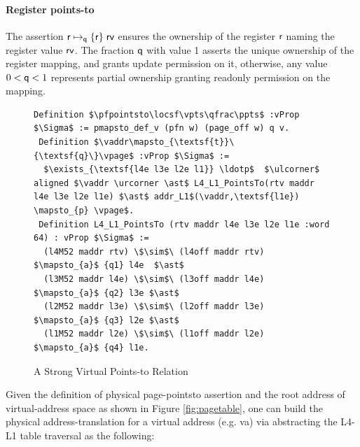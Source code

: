 \paragraph{Register points-to} The assertion $\mathsf{r}\mapsto_{\mathsf{q}}\{\mathsf{r}\}\;\mathsf{rv}$ ensures the ownership of the register $\mathsf{r}$ naming the register value $\mathsf{rv}$. The fraction $\mathsf{q}$ with value 1 asserts the unique ownership of the register mapping, and grants update permission on it, otherwise, any value $0 < \mathsf{q} <1$ represents partial ownership granting readonly permission on the mapping.
\begin{figure}
  \begin{lstlisting}[language=Coq]
 Definition $\pfpointsto\locsf\vpts\qfrac\ppts$ :vProp $\Sigma$ := pmapsto_def_v (pfn w) (page_off w) q v.
 Definition $\vaddr\mapsto_{\textsf{t}}\{\textsf{q}\}\vpage$ :vProp $\Sigma$ := 
  $\exists_{\textsf{l4e l3e l2e l1}} \ldotp$  $\ulcorner$ aligned $\vaddr \urcorner \ast$ L4_L1_PointsTo(rtv maddr l4e l3e l2e l1e) $\ast$ addr_L1$(\vaddr,\textsf{l1e}) \mapsto_{p} \vpage$.
 Definition L4_L1_PointsTo (rtv maddr l4e l3e l2e l1e :word 64) : vProp $\Sigma$ :=
  (l4M52 maddr rtv) \$\sim$\ (l4off maddr rtv) $\mapsto_{a}$ {q1} l4e  $\ast$
  (l3M52 maddr l4e) \$\sim$\ (l3off maddr l4e)  $\mapsto_{a}$ {q2} l3e $\ast$ 
  (l2M52 maddr l3e) \$\sim$\ (l2off maddr l3e) $\mapsto_{a}$ {q3} l2e $\ast$
  (l1M52 maddr l2e) \$\sim$\ (l1off maddr l2e) $\mapsto_{a}$ {q4} l1e.
\end{lstlisting}
\caption{A Strong Virtual Points-to Relation}
  \label{fig:strongvirtualpointsto}
\end{figure}
Given the definition of physical page-pointsto assertion and the root address of virtual-address space as shown in Figure \ref{fig:pagetable}, one can build the physical address-translation for a virtual address (e.g. \textsf{va}) via abstracting the L4-L1 table traversal as the following:
